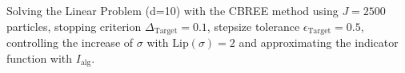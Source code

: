 Solving the Linear Problem (d=10) with the CBREE method using  $J = 2500$ particles, stopping criterion $\Delta_{\text{Target}} = 0.1$, stepsize tolerance $\epsilon_{\text{Target}} = 0.5$, controlling the increase of $\sigma$ with $\text{Lip}(\sigma) = 2$ and approximating the indicator function with $I_\text{alg}$.